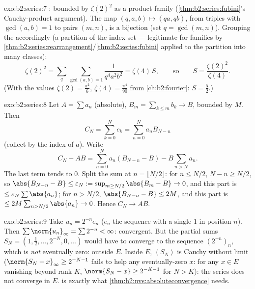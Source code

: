 \begin{solution}{exo:b2:series:7}
: bounded by $\zeta(2)^2$ as a product family
(\cref{thm:b2:series:fubini}'s Cauchy-product argument). The map
$(q, a, b) \mapsto (qa, qb)$, from triples with $\gcd(a, b) = 1$
to pairs $(m, n)$, is a bijection (set $q = \gcd(m,n)$). Grouping
the  accordingly (a partition of the index set ---
legitimate for  families by
\cref{thm:b2:series:rearrangement}/\cref{thm:b2:series:fubini}
applied to the partition into  many classes):
\[
\zeta(2)^2 = \sum_{q} \sum_{\gcd(a,b)=1} \frac{1}{q^4 a^2 b^2}
= \zeta(4)\, S,
\qquad\text{so}\qquad
S = \frac{\zeta(2)^2}{\zeta(4)} .
\]
(With the values $\zeta(2) = \frac{\pi^2}{6}$,
$\zeta(4) = \frac{\pi^4}{90}$ from
\cref{ch:b2:fourier}: $S = \frac{5}{2}$.)
\end{solution}

\begin{solution}{exo:b2:series:8}
Let $A = \sum a_n$ (absolute), $B_m = \sum_{k\leq m} b_k \to B$,
bounded by $M$. Then
\[
C_N = \sum_{k=0}^{N} c_k = \sum_{n=0}^{N} a_n B_{N-n}
\]
(collect by the index of $a$). Write
\[
C_N - AB = \sum_{n=0}^{N} a_n (B_{N-n} - B) - B\sum_{n > N} a_n .
\]
The last term tends to $0$. Split the sum at $n = \lfloor N/2
\rfloor$: for $n \leq N/2$, $N - n \geq N/2$, so $\abs{B_{N-n} - B}
\leq \varepsilon_N := \sup_{m \geq N/2}\abs{B_m - B} \to 0$, and
this part is $\leq \varepsilon_N \sum\abs{a_n}$; for $n > N/2$,
$\abs{B_{N-n} - B} \leq 2M$, and this part is $\leq 2M \sum_{n >
N/2} \abs{a_n} \to 0$. Hence $C_N \to AB$.
\end{solution}

\begin{solution}{exo:b2:series:9}
Take $u_n = 2^{-n} e_n$ ($e_n$ the sequence with a single $1$ in
position $n$). Then $\sum \norm{u_n}_\infty = \sum 2^{-n} <
\infty$:  convergent. But the partial sums $S_N =
(1, \tfrac12, \dots, 2^{-N}, 0, \dots)$ would have to converge to
the sequence $(2^{-n})_n$, which is \emph{not} eventually zero:
outside $E$. Inside $E$, $(S_N)$ is Cauchy without limit ($\norm{S_N
- x}_\infty \geq 2^{-N-1}$ fails to help any eventually-zero $x$:
for any $x \in E$ vanishing beyond rank $K$, $\norm{S_N - x} \geq
2^{-K-1}$ for $N > K$): the series does not converge in $E$.
 is exactly what \cref{thm:b2:nvs:absoluteconvergence}
needs.
\end{solution}

